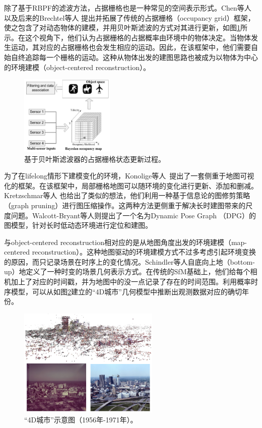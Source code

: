 除了基于RBPF的滤波方法，占据栅格也是一种常见的空间表示形式。Chen等人\cite{Chen2006Dynamic}以及后来的Brechtel等人\cite{Brechtel2010Recursive} 提出并拓展了传统的占据栅格（occupancy grid）框架，使之包含了对动态物体的建模，并用贝叶斯滤波的方式对其进行更新，如图\ref{fig: object_tracking_system}所示。在这个视角下，他们认为占据栅格的占据概率由环境中的物体决定。当物体发生运动，其对应的占据栅格也会发生相应的运动。因此，在该框架中，他们需要自始自终追踪每一个栅格的运动。这种从物体出发的建图思路也被成为以物体为中心的环境建模（object-centered reconstruction）。

\begin{figure}[htbp]
	\centering
	\includegraphics[width=0.4\textwidth]{figs/2-3/bayesian.png}
	\caption{基于贝叶斯滤波器的占据栅格状态更新过程。}
	\label{fig: object_tracking_system}
\end{figure}

为了在lifelong情形下建模变化的环境，Konolige等人~\cite{Konolige2009Towards}提出了一套侧重于地图可视化的框架。在该框架中，局部栅格地图可以随环境的变化进行更新、添加和删减。Kretzschmar等人\cite{Kretzschmar2012Information} 也给出了类似的想法，他们利用一种基于信息论的图修剪策略（graph pruning）进行图压缩操作。这两种方法更侧重于解决长时建图带来的尺度问题。Walcott-Bryant等人\cite{Walcott2012Dynamic}则提出了一个名为Dynamic Pose Graph （DPG）的图模型，针对长时低动态环境进行定位和建图。

与object-centered reconstruction相对应的是从地图角度出发的环境建模（map-centered reconstruction）。这种地图驱动的环境建模方式不过多考虑引起环境变换的原因，而只记录场景在时序上的变化情况。Schindler等人\cite{Schindler2010Probabilistic}自底向上地（bottom-up）地定义了一种时变的场景几何表示方式。在传统的SfM基础上，他们给每个相机加上了对应的时间戳，并为地图中的没一点记录了存在的时间范围。利用概率时序模型，可以从如图\ref{fig: 4D city}建立的“4D城市”几何模型中推断出观测数据对应的确切年份。

\begin{figure}[htbp]
	\centering
	\includegraphics[width=0.6\textwidth]{figs/2-3/city.png}
	\caption{“4D城市”示意图（1956年-1971年）。}
	\label{fig: 4D city}
\end{figure}

